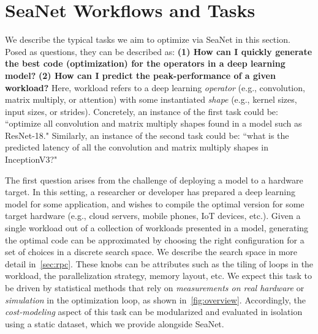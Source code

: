 
\section{SeaNet Workflows and Tasks}
\label{sec:tasks}
We describe the typical tasks we aim to optimize via SeaNet in this section.
Posed as questions, they can be described as: \textbf{(1) How can I quickly generate the best code (optimization) for the operators in a deep learning model?} \textbf{(2) How can I predict the peak-performance of a given workload?}
Here, workload refers to a deep learning \emph{operator} (e.g., convolution, matrix multiply, or attention) with some instantiated \emph{shape} (e.g., kernel sizes, input sizes, or strides). 
Concretely, an instance of the first task could be: ``optimize all convolution and matrix multiply shapes found in a model such as ResNet-18."
Similarly, an instance of the second task could be: ``what is the predicted latency of all the convolution and matrix multiply shapes in InceptionV3?"


The first question arises from the challenge of deploying a model to a hardware target.
In this setting, a researcher or developer has prepared a deep learning model for some application, and wishes to compile the optimal version for some target hardware (e.g., cloud servers, mobile phones, IoT devices, etc.).
Given a single workload out of a collection of workloads presented in a model, generating the optimal code can be approximated by choosing the right configuration for a set of choices in a discrete search space.
We describe the search space in more detail in~\autoref{sec:rpc}.
These knobs can be attributes such as the tiling of loops in the workload, the parallelization strategy, memory layout, etc.
We expect this task to be driven by statistical methods that rely on \emph{measurements on real hardware} or \emph{simulation} in the optimization loop, as shown in~\autoref{fig:overview}.
Accordingly, the \emph{cost-modeling} aspect of this task can be modularized and evaluated in isolation using a static dataset, which we provide alongside SeaNet.


